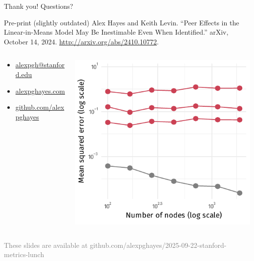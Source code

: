 \documentclass[aspectratio=169]{beamer}
\theoremstyle{remark}
\begin{document}
\begin{frame}{Thank you! Questions?}
    \vspace{2mm}
    \footnotesize
    \begin{block}{Pre-print (slightly outdated)}
        Alex Hayes and Keith Levin. “Peer Effects in the Linear-in-Means Model May Be Inestimable Even When Identified.” arXiv, October 14, 2024. \url{http://arxiv.org/abs/2410.10772}.
    \end{block}
    \normalsize
    \begin{columns}
        \begin{column}{0.4\textwidth}
            \begin{itemize}
                \item[]  \href{mailto:alexpgh@stanford.edu}{alexpgh@stanford.edu}
                \item[]  \href{https://www.alexpghayes.com}{alexpghayes.com}
                \item[]  \href{https://github.com/alexpghayes}{github.com/alexpghayes}
            \end{itemize}
        \end{column}
        \begin{column}{0.6\textwidth}
            \centering
            \includegraphics[scale=0.65]{./figures/simulations/jobtalk-last-slide.pdf}
        \end{column}
    \end{columns}
    
    \footnotesize{\textcolor{gray}{These slides are available at github.com/alexpghayes/2025-09-22-stanford-metrics-lunch}}
\end{frame}
\end{document}
